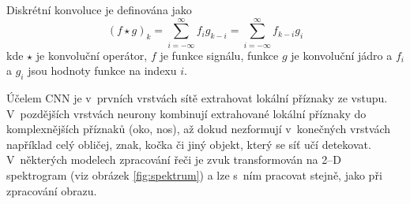 Diskrétní konvoluce je definována jako
\begin{equation}
   (f \star g)_k = \sum_{i=-\infty}^{\infty} f_i g_{k-i} = \sum_{i=-\infty}^{\infty} f_{k-i} g_{i}
\end{equation}
kde $\star$ je konvoluční operátor, $f$ je funkce signálu, funkce $g$ je konvoluční jádro a $f_i$ a $g_i$ jsou hodnoty funkce na indexu $i$.


Účelem CNN je v~prvních vrstvách sítě extrahovat lokální příznaky ze vstupu. V~pozdějších vrstvách neurony kombinují extrahované lokální příznaky do komplexnějších příznaků (oko, nos), až dokud nezformují v~konečných vrstvách například celý obličej, znak, kočka či jiný objekt, který se síť učí detekovat. V~některých modelech zpracování řeči je zvuk transformován na 2--D spektrogram (viz obrázek \ref{fig:spektrum}) a lze s~ním pracovat stejně, jako při zpracování obrazu.






